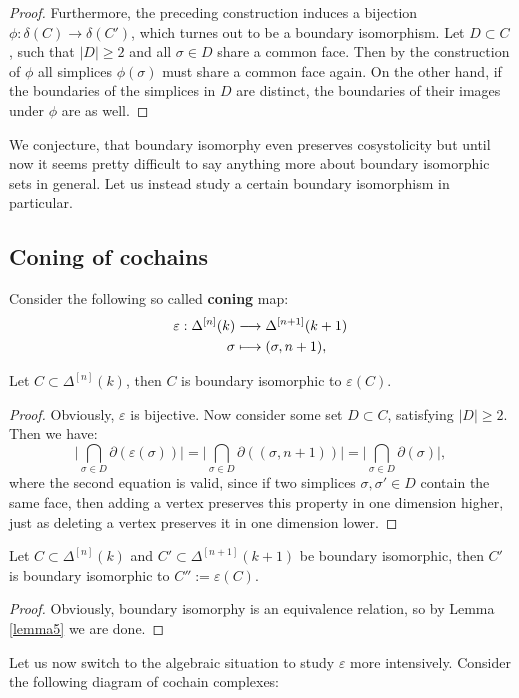 \begin{prop}
\begin{proof}
Furthermore, the preceding construction induces a bijection \(\phi:\delta(C)\rightarrow\delta(C')\), which turnes out to be a boundary isomorphism. Let \(D\subset C\), such that \(|D|\geq 2\) and all \(\sigma\in D\) share a common face. Then by the construction of \(\phi\) all simplices \(\phi(\sigma)\) must share a common face again. On the other hand, if the boundaries of the simplices in \(D\) are distinct, the boundaries of their images under \(\phi\) are as well.
\end{proof}
\end{prop}

We conjecture, that boundary isomorphy even preserves cosystolicity but until now it seems pretty difficult to say anything more about boundary isomorphic sets in general. Let us instead study a certain boundary isomorphism in particular.

\subsection{Coning of cochains}

Consider the following so called \textbf{coning} map:
\begin{align}
\varepsilon:\Delta^{[n]}(k)&\longrightarrow\Delta^{[n+1]}(k+1)\notag\\
\sigma&\longmapsto (\sigma,n+1),\notag
\end{align}

\begin{lem}\label{lemma5}
Let \(C\subset\Delta^{[n]}(k)\), then \(C\) is boundary isomorphic to \(\varepsilon(C)\).
\begin{proof}
Obviously, \(\varepsilon\) is bijective. Now consider some set \(D\subset C\), satisfying \(|D|\geq 2\). Then we have:
\[
\bigg\vert\bigcap\limits_{\sigma\in D}\partial(\varepsilon(\sigma))\bigg\vert=\bigg\vert\bigcap\limits_{\sigma\in D}\partial((\sigma,n+1))\bigg\vert=\bigg\vert\bigcap\limits_{\sigma\in D}\partial(\sigma)\bigg\vert,
\]
where the second equation is valid, since if two simplices \(\sigma,\sigma'\in D\) contain the same face, then adding a vertex preserves this property in one dimension higher, just as deleting a vertex preserves it in one dimension lower.
\end{proof}
\end{lem}
\begin{lem}\label{lemma7}
Let \(C\subset\Delta^{[n]}(k)\) and \(C'\subset\Delta^{[n+1]}(k+1)\) be boundary isomorphic, then \(C'\) is boundary isomorphic to \(C'':=\varepsilon(C)\).
\begin{proof}
Obviously, boundary isomorphy is an equivalence relation, so by Lemma \ref{lemma5} we are done.
\end{proof}
\end{lem}
Let us now switch to the algebraic situation to study \(\varepsilon\) more intensively. Consider the following diagram of cochain complexes:

